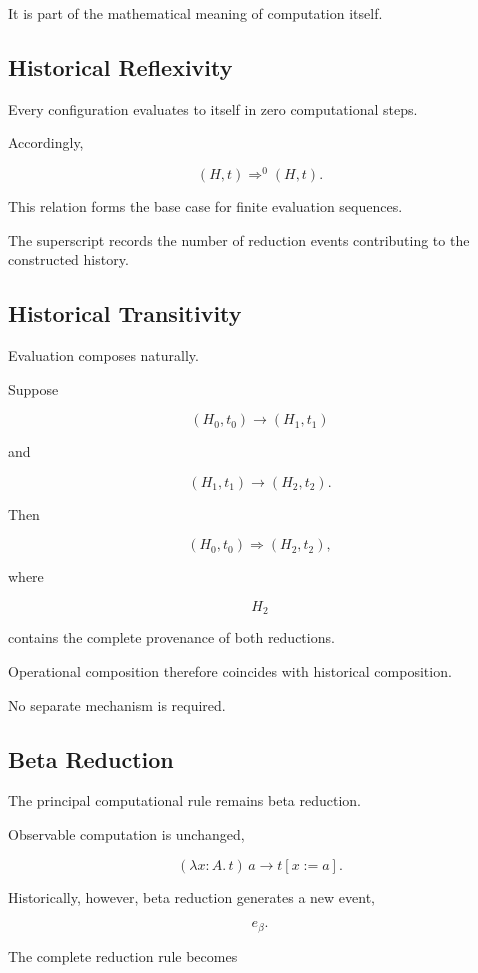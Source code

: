 \documentclass[12pt,oneside]{article}
\theoremstyle{definition}
\theoremstyle{remark}
\begin{document}
It is part of the mathematical meaning of computation itself.

\subsection{Historical Reflexivity}

Every configuration evaluates to itself in zero computational steps.

Accordingly,

\[
(H,t)
\Longrightarrow^{0}
(H,t).
\]

This relation forms the base case for finite evaluation sequences.

The superscript records the number of reduction events contributing to the
constructed history.

\subsection{Historical Transitivity}

Evaluation composes naturally.

Suppose

\[
(H_0,t_0)
\longrightarrow
(H_1,t_1)
\]

and

\[
(H_1,t_1)
\longrightarrow
(H_2,t_2).
\]

Then

\[
(H_0,t_0)
\Longrightarrow
(H_2,t_2),
\]

where

\[
H_2
\]

contains the complete provenance of both reductions.

Operational composition therefore coincides with historical composition.

No separate mechanism is required.

\subsection{Beta Reduction}

The principal computational rule remains beta reduction.

Observable computation is unchanged,

\[
(\lambda x:A.\,t)\,a
\longrightarrow
t[x:=a].
\]

Historically, however, beta reduction generates a new event,

\[
e_\beta.
\]

The complete reduction rule becomes
\end{document}

